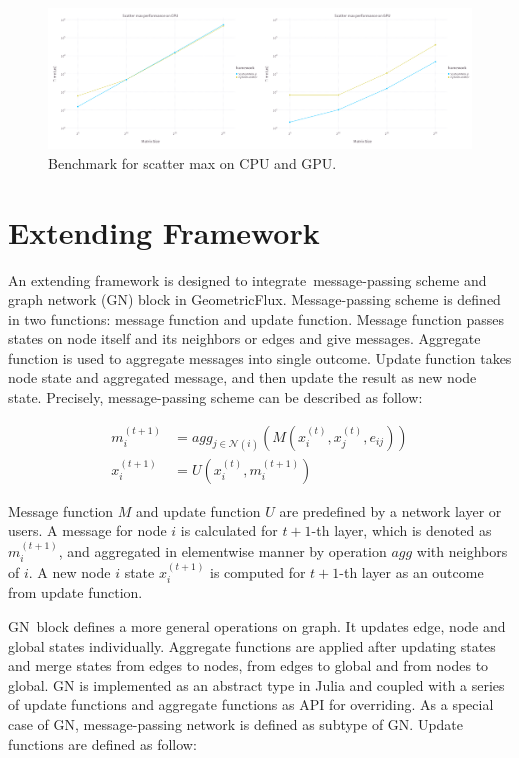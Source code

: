 \documentclass{juliacon}
\begin{document}
\begin{figure}[h]
\centerline{\includegraphics[width=18cm]{figures/scatter_max.png}}
\caption{Benchmark for scatter max on CPU and GPU.}
    \label{fig:scatter_max}
\end{figure}

\section{Extending Framework}

An extending framework is designed to integrate message-passing scheme and graph network (GN)
block in GeometricFlux. Message-passing scheme is defined in two functions: message function
and update function. Message function passes states on node itself and its neighbors or edges
and give messages. Aggregate function is used to aggregate messages into single outcome.
Update function takes node state and aggregated message, and then update the result as new
node state. Precisely, message-passing scheme can be described as follow:

\[
    \begin{aligned}
    m_i^{(t+1)} &= agg_{j \in \mathcal{N}(i)}(M(x_i^{(t)}, x_j^{(t)}, e_{ij})) \\
    x_i^{(t+1)} &= U(x_i^{(t)}, m_i^{(t+1)})
    \end{aligned}
\]

Message function $M$ and update function $U$ are predefined by a network layer or users.
A message for node $i$ is calculated for $t+1$-th layer, which is denoted as $m_i^{(t+1)}$,
and aggregated in elementwise manner by operation $agg$ with neighbors of $i$. A new node $i$
state $x_i^{(t+1)}$ is computed for $t+1$-th layer as an outcome from update function.

GN block defines a more general operations on graph. It updates edge, node and global states
individually. Aggregate functions are applied after updating states and merge states from edges
to nodes, from edges to global and from nodes to global. GN is implemented as an abstract
type in Julia and coupled with a series of update functions and aggregate functions as API
for overriding. As a special case of GN, message-passing network is defined as subtype of GN.
Update functions are defined as follow:
\end{document}
